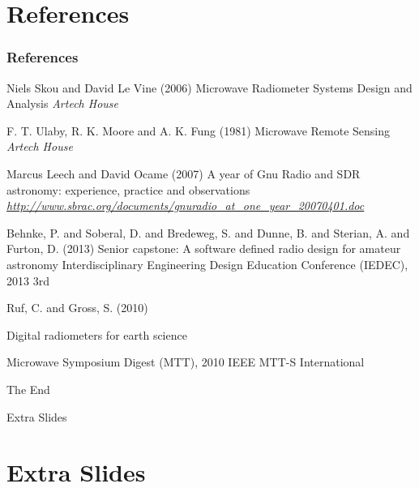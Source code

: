 \documentclass[notes]{beamer}
\begin{document}
\section{References}
\begin{frame}
\frametitle{References}
\footnotesize{
\begin{thebibliography}{99}
 Niels Skou and David Le Vine (2006)
\newblock Microwave Radiometer Systems Design and Analysis
\newblock \emph{Artech House}

 F. T. Ulaby, R. K. Moore and A. K. Fung (1981)
\newblock Microwave Remote Sensing
\newblock \emph{Artech House}

 Marcus Leech and David Ocame (2007)
\newblock A year of Gnu Radio and SDR astronomy: experience, practice and observations
\newblock \emph{\url{http://www.sbrac.org/documents/gnuradio_at_one_year_20070401.doc}}

 Behnke, P. and Soberal, D. and Bredeweg, S. and Dunne, B. and Sterian, A. and Furton, D. (2013)
\newblock Senior capstone: A software defined radio design for amateur astronomy
\newblock Interdisciplinary Engineering Design Education Conference (IEDEC), 2013 3rd

 Ruf, C. and Gross, S. (2010)

\newblock Digital radiometers for earth science

\newblock Microwave Symposium Digest (MTT), 2010 IEEE MTT-S International

\end{thebibliography}
}
\end{frame}

\begin{frame}
\Huge{\centerline{The End}}
\end{frame}

\begin{frame}
\Huge{\centerline{Extra Slides}}
\end{frame}
\section*{Extra Slides}
\end{document}
